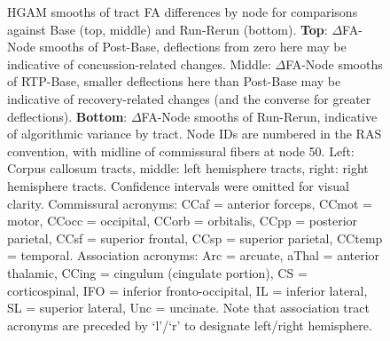 \documentclass[12pt]{article}
\begin{document}
\begin{figure}[H]
	\centering
	\caption{HGAM smooths of tract FA differences by node for comparisons against Base (top, middle) and Run-Rerun (bottom). \textbf{Top}: $\Delta$FA-Node smooths of Post-Base, deflections from zero here may be indicative of concussion-related changes. Middle: $\Delta$FA-Node smooths of RTP-Base, smaller deflections here than Post-Base may be indicative of recovery-related changes (and the converse for greater deflections). \textbf{Bottom}: $\Delta$FA-Node smooths of Run-Rerun, indicative of algorithmic variance by tract. Node IDs are numbered in the RAS convention, with midline of commissural fibers at node 50. Left: Corpus callosum tracts, middle: left hemisphere tracts, right: right hemisphere tracts. Confidence intervals were omitted for visual clarity. Commissural acronyms: CCaf = anterior forceps, CCmot = motor, CCocc = occipital, CCorb = orbitalis, CCpp = posterior parietal, CCsf = superior frontal, CCsp = superior parietal, CCtemp = temporal. Association acronyms: Arc = arcuate, aThal = anterior thalamic, CCing = cingulum (cingulate portion), CS = corticospinal, IFO = inferior fronto-occipital, IL = inferior lateral, SL = superior lateral, Unc = uncinate. Note that association tract acronyms are preceded by `l'/`r' to designate left/right hemisphere.}
	\label{fig:ldi-gam}
\end{figure}


\end{document}
